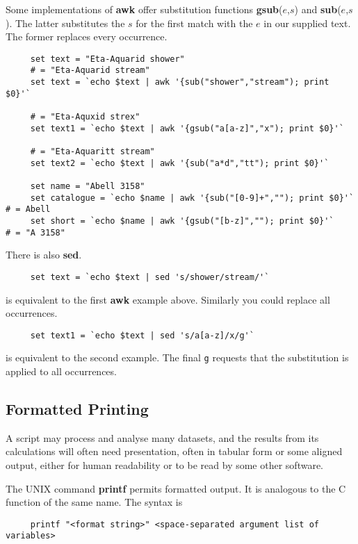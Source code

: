 Some implementations of {\bf awk} offer substitution functions {\bf
gsub}($e$,$s$) and {\bf sub}($e$,$s$).  The latter substitutes the $s$
for the first match with the  $e$ in our supplied text.  The former
replaces every occurrence.

\small
\begin{verbatim}
     set text = "Eta-Aquarid shower"
     # = "Eta-Aquarid stream"
     set text = `echo $text | awk '{sub("shower","stream"); print $0}'` 
     
     # = "Eta-Aquxid strex"
     set text1 = `echo $text | awk '{gsub("a[a-z]","x"); print $0}'`

     # = "Eta-Aquaritt stream"
     set text2 = `echo $text | awk '{sub("a*d","tt"); print $0}'`

     set name = "Abell 3158"
     set catalogue = `echo $name | awk '{sub("[0-9]+",""); print $0}'`  # = Abell
     set short = `echo $name | awk '{gsub("[b-z]",""); print $0}'`      # = "A 3158"
\end{verbatim}
\normalsize

There is also {\bf sed}.
\small
\begin{verbatim}
     set text = `echo $text | sed 's/shower/stream/'`
\end{verbatim}
\normalsize
is equivalent to the first {\bf awk} example above.  Similarly you could
replace all occurrences.

\small
\begin{verbatim}
     set text1 = `echo $text | sed 's/a[a-z]/x/g'`
\end{verbatim}
\normalsize
is equivalent to the second example.  The final {\tt g} requests that the
substitution is applied to all occurrences.

\subsection{Formatted Printing
\label{sc4_se_form_print}}

A script may process and analyse many datasets, and the results from
its calculations will often need presentation, often in tabular form
or some aligned output, either for human readability or to be read by
some other software.

The UNIX command {\bf printf} permits formatted output.  It is
analogous to the C function of the same name.  The syntax is

\small
\begin{verbatim}
     printf "<format string>" <space-separated argument list of variables>
\end{verbatim}
\normalsize

